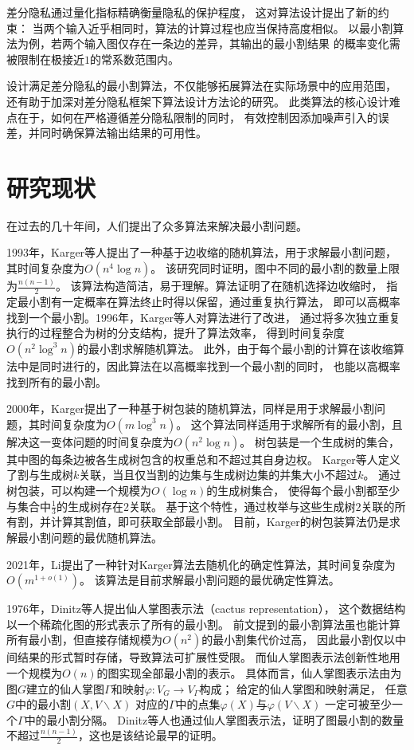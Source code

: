 差分隐私通过量化指标精确衡量隐私的保护程度，
这对算法设计提出了新的约束：
当两个输入近乎相同时，算法的计算过程也应当保持高度相似。
以最小割算法为例，若两个输入图仅存在一条边的差异，其输出的最小割结果
的概率变化需被限制在极接近$1$的常系数范围内。

设计满足差分隐私的最小割算法，不仅能够拓展算法在实际场景中的应用范围，
还有助于加深对差分隐私框架下算法设计方法论的研究。
此类算法的核心设计难点在于，如何在严格遵循差分隐私限制的同时，
有效控制因添加噪声引入的误差，并同时确保算法输出结果的可用性。

\section{研究现状}

在过去的几十年间，人们提出了众多算法来解决最小割问题。

1993年，Karger等人提出了一种基于边收缩的随机算法，用于求解最小割问题，其时间复杂度为$O(n^4\log n)$。
该研究同时证明，图中不同的最小割的数量上限为$\frac{n(n-1)}2$。\cite{karger1993global}
该算法构造简洁，易于理解。算法证明了在随机选择边收缩时，
指定最小割有一定概率在算法终止时得以保留，通过重复执行算法，
即可以高概率找到一个最小割。1996年，Karger等人对算法进行了改进，
通过将多次独立重复执行的过程整合为树的分支结构，提升了算法效率，
得到时间复杂度$O(n^2\log^3 n)$的最小割求解随机算法。\cite{karger1996new}
此外，由于每个最小割的计算在该收缩算法中是同时进行的，因此算法在以高概率找到一个最小割的同时，
也能以高概率找到所有的最小割。

2000年，Karger提出了一种基于树包装的随机算法，同样是用于求解最小割问题，其时间复杂度为$ O(m\log^3n)$。\cite{karger2000minimum}
这个算法同样适用于求解所有的最小割，且解决这一变体问题的时间复杂度为$O(n^2\log n)$。
树包装是一个生成树的集合，其中图的每条边被各生成树包含的权重总和不超过其自身边权。
Karger等人定义了割与生成树$k$关联，当且仅当割的边集与生成树边集的并集大小不超过$k$。
通过树包装，可以构建一个规模为$O(\log n)$的生成树集合，
使得每个最小割都至少与集合中$\frac13$的生成树存在$2$关联。
基于这个特性，通过枚举与这些生成树$2$关联的所有割，并计算其割值，即可获取全部最小割。
目前，Karger的树包装算法仍是求解最小割问题的最优随机算法。

2021年，Li提出了一种针对Karger算法去随机化的确定性算法，其时间复杂度为$O(m^{1+o(1)})$。\cite{li2021deterministic}
该算法是目前求解最小割问题的最优确定性算法。

1976年，Dinitz等人提出仙人掌图表示法（cactus representation），
这个数据结构以一个稀疏化图的形式表示了所有的最小割。\cite{dinitz1976structure}\cite{fleiner2009quick}
前文提到的最小割算法虽也能计算所有最小割，但直接存储规模为$O(n^2)$的最小割集代价过高，
因此最小割仅以中间结果的形式暂时存储，导致算法可扩展性受限。
而仙人掌图表示法创新性地用一个规模为$O(n)$的图实现全部最小割的表示。
具体而言，仙人掌图表示法由为图$G$建立的仙人掌图$\Gamma$和映射$\varphi:V_G\rightarrow V_\Gamma$构成；
给定的仙人掌图和映射满足，
任意$G$中的最小割$(X,V\backslash X)$
对应的$\Gamma$中的点集$\varphi(X)$与$\varphi(V\backslash X)$
一定可被至少一个$\Gamma$中的最小割分隔。
Dinitz等人也通过仙人掌图表示法，证明了图最小割的数量不超过$\frac{n(n-1)}2$，这也是该结论最早的证明。

